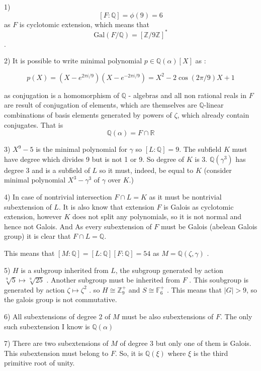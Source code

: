 \documentclass[12pt]{article}
\begin{document}
1) $$ [F : \mathbb{Q}] = \phi(9) = 6 $$ as $ F $  is cyclotomic extension, which means that 
 $$ \mathrm{Gal}(F/\mathbb{Q}) =[\mathbb{Z}/9\mathbb{Z}]^* $$ .

2) It is possible to write minimal polynomial $ p \in \mathbb{Q}(\alpha)[ X]$ as :

 $$
   p(X)    =  ( X - e^{2\pi i / 9})( X - e^{ - 2 \pi i / 9 }   ) =  X^2 -  2 \cos( 2 \pi / 9  ) X + 1
 $$ 

as conjugation is a homomorphism of $ \mathbb{Q} $ - algebras and all non rational reals  in $F$  are result of conjugation of elements, which are themselves are $\mathbb{Q}$-linear combinations of basis elements generated by powers of $\zeta$, which already contain conjugates.  
That is 
 $$
    \mathbb{Q}(\alpha)  = F \cap \mathbb{R}
 $$ 

3)    $X^9 - 5$ is the minimal polynomial for $ \gamma $ so $[ L : \mathbb{Q} ] = 9$.   The subfield $K$ must have degree which divides 9 but is not 1 or 9. So degree of $K$ is 3.  $ \mathbb{Q}(\gamma^3)$  has degree 3 and is a subfield of $L$ so it must, indeed, be equal  to  $K$ (consider minimal polynomial $X^3 - \gamma^3$ of $\gamma$ over $K$.) 

4) In case of nontrivial intersection $F \cap L = K$ as it must be nontrivial subextension of $L$. 
 It is also know that extension $F$  is Galois as cyclotomic extension, however $K$ does not split any polynomials, so it is not normal and hence not Galois. And As every subextension of $F$ must be Galois (abelean Galois group) it is clear that $F \cap L = \mathbb{Q}$.

This means that $[M : \mathbb{Q}] = [ L : \mathbb{Q}][F : \mathbb{Q}] = 54$ as $ M = \mathbb{Q}(\zeta, \gamma)$ .

5) $H$ is a subgroup inherited from $L$, the subgroup generated by action $ \sqrt[9]{ 5 } \mapsto \sqrt[9]{25}$ . Another subgroup must be inherited from $F$ . This soubgroup is generated by  action $ \zeta \mapsto \zeta^2 $ . so $H \cong \mathbb{Z}_9^+$ and $S \cong \mathbb{F}_6^+$ . This means that $|G| > 9  $, so the galois group is not commutative. 

6)  All subextensions of degree 2  of $M$ must be also subextensions of $F$. The only  such subextension I know is $\mathbb{Q}(\alpha)$

7) There are two subextensions of $M$ of degree 3 but only one of them is Galois. This subextension must belong to $F$. So, it is $\mathbb{Q}(\xi)$ where $\xi$ is the third primitive root of unity.
\end{document}
